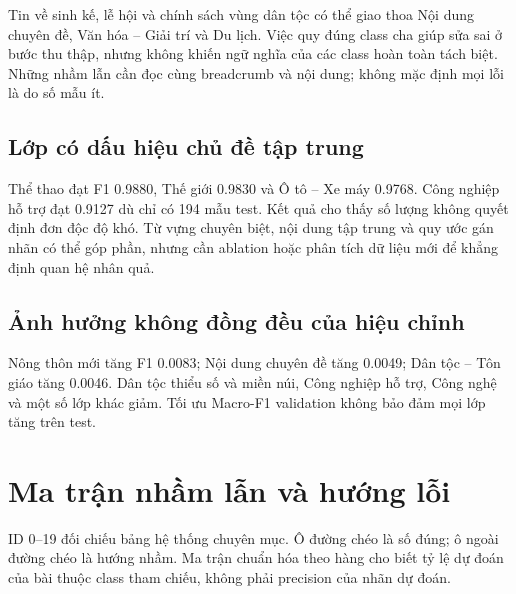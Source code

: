Tin về sinh kế, lễ hội và chính sách vùng dân tộc có thể giao thoa Nội dung chuyên đề, Văn hóa -- Giải trí và Du lịch. Việc quy đúng class cha giúp sửa sai ở bước thu thập, nhưng không khiến ngữ nghĩa của các class hoàn toàn tách biệt. Những nhầm lẫn cần đọc cùng breadcrumb và nội dung; không mặc định mọi lỗi là do số mẫu ít.

\subsection{Lớp có dấu hiệu chủ đề tập trung}
Thể thao đạt F1 0.9880, Thế giới 0.9830 và Ô tô -- Xe máy 0.9768. Công nghiệp hỗ trợ đạt 0.9127 dù chỉ có 194 mẫu test. Kết quả cho thấy số lượng không quyết định đơn độc độ khó. Từ vựng chuyên biệt, nội dung tập trung và quy ước gán nhãn có thể góp phần, nhưng cần ablation hoặc phân tích dữ liệu mới để khẳng định quan hệ nhân quả.

\subsection{Ảnh hưởng không đồng đều của hiệu chỉnh}
Nông thôn mới tăng F1 0.0083; Nội dung chuyên đề tăng 0.0049; Dân tộc -- Tôn giáo tăng 0.0046. Dân tộc thiểu số và miền núi, Công nghiệp hỗ trợ, Công nghệ và một số lớp khác giảm. Tối ưu Macro-F1 validation không bảo đảm mọi lớp tăng trên test.

\section{Ma trận nhầm lẫn và hướng lỗi}
ID 0--19 đối chiếu bảng hệ thống chuyên mục. Ô đường chéo là số đúng; ô ngoài đường chéo là hướng nhầm. Ma trận chuẩn hóa theo hàng cho biết tỷ lệ dự đoán của bài thuộc class tham chiếu, không phải precision của nhãn dự đoán.

